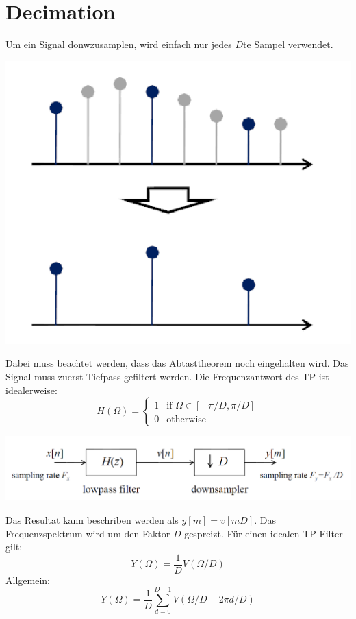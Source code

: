 \section{Decimation}
Um ein Signal donwzusamplen, wird einfach nur jedes $D$te Sampel verwendet.
\begin{center}
	\includegraphics[scale=.7]{./images/downsample}
\end{center}
Dabei muss beachtet werden, dass das Abtasttheorem noch eingehalten wird. Das
Signal muss zuerst Tiefpass gefiltert werden. Die Frequenzantwort des TP ist
idealerweise:
\[ H(\Omega) = \left\lbrace \begin{matrix}
	1 & \textrm{if } \Omega \in [-\pi/D,\pi/D]\\
	0 & \textrm{otherwise}
\end{matrix} \right. \] 
\begin{center}
	\includegraphics[scale=.7]{./images/decimation}
\end{center}
Das Resultat kann beschriben werden als $y[m] = v[mD]$. Das Frequenzspektrum
wird um den Faktor $D$ gespreizt. Für einen idealen TP-Filter gilt:
\[ Y(\Omega) = \frac{1}{D} V(\Omega/D)  \]
Allgemein:
\[ Y(\Omega) = \frac{1}{D} \sum_{d=0}^{D-1} V(\Omega/D-2\pi d/D) \]
